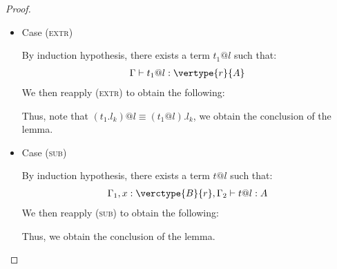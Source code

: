\begin{proof}
\begin{itemize}
\item Case (\textsc{extr})
\begin{center}
    \begin{minipage}{.50\linewidth}
    \end{minipage}
\end{center}
By induction hypothesis, there exists a term $t_1@l$ such that:
\begin{align*}
\Gamma \vdash t_1@l : \vertype{r}{A}
\end{align*}
We then reapply (\textsc{extr}) to obtain the following:
\begin{center}
    \begin{minipage}{.55\linewidth}
    \end{minipage}
\end{center}
Thus, note that $(t_1.l_k)@l \equiv (t_1@l).l_k$, we obtain the conclusion of the lemma.
\\

\item Case (\textsc{sub})
\begin{center}
    \begin{minipage}{.55\linewidth}
    \end{minipage}
\end{center}
By induction hypothesis, there exists a term $t@l$ such that:
\begin{align*}
\Gamma_1, x:\verctype{B}{r}, \Gamma_2 \vdash t@l : A
\end{align*}
We then reapply (\textsc{sub}) to obtain the following:
\begin{center}
    \begin{minipage}{.55\linewidth}
    \end{minipage}
\end{center}
Thus, we obtain the conclusion of the lemma.

\end{itemize}
\end{proof}








